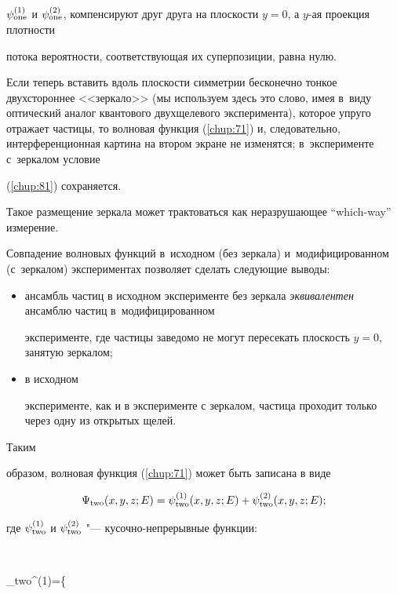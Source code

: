$\psi_{\rm one}^{(1)}$ и $\psi_{\rm one}^{(2)}$, компенсируют друг друга на плоскости $y=0$, а $y$-ая проекция плотности

потока вероятности, соответствующая их суперпозиции, равна нулю. 

Если теперь вставить вдоль плоскости симметрии бесконечно тонкое двухстороннее <<зеркало>> (мы используем здесь это слово, имея в~виду оптический аналог квантового двухщелевого эксперимента), которое упруго отражает частицы, то волновая функция (\ref{chup:71}) и, следовательно, интерференционная картина на втором экране не изменятся; в~эксперименте с~зеркалом условие

(\ref{chup:81}) сохраняется.



Такое размещение зеркала может трактоваться как неразрушающее ``which-way'' измерение. 

Совпадение волновых функций в~исходном (без зеркала) и~модифицированном (с~зеркалом) экспериментах позволяет сделать следующие выводы: 

\begin{itemize}

\item[(\i)] ансамбль частиц в исходном эксперименте без зеркала {\it эквивалентен} ансамблю частиц в~модифицированном

эксперименте, где частицы заведомо не могут пересекать плоскость $y=0$, занятую зеркалом; 

\item[(\i\i)] в исходном

эксперименте, как и в эксперименте с зеркалом, частица проходит только через одну из открытых щелей.

\end{itemize}

 Таким

образом, волновая функция (\ref{chup:71}) может быть записана в виде

\begin{equation} \label{chup:73}

\Psi_{\rm two}(x,y,z;E)=\psi_{\rm two}^{(1)}(x,y,z;E)+\psi_{\rm two}^{(2)}(x,y,z;E);

\end{equation}

где $\psi_{\rm two}^{(1)}$ и $\psi_{\rm two}^{(2)}$ "--- кусочно-непрерывные функции:

$$

\psi_{\rm two}^{(1)}=\left\{ 

